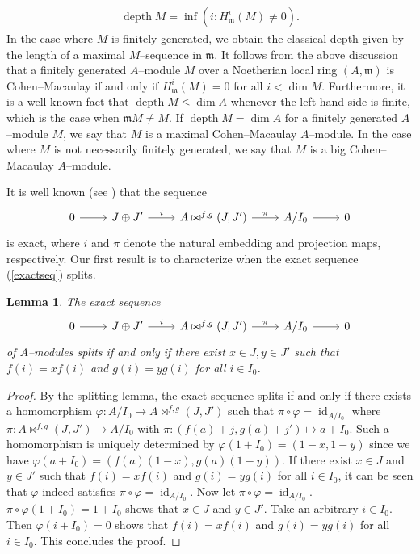 \documentclass{amsart}%
\theoremstyle{plain}
\newtheorem{lemma}{Lemma}[section]
\numberwithin{equation}{section}
\theoremstyle{definition}
\DeclareMathOperator{\depth}{depth}
\begin{document}
\begin{align*}
    \depth M=\inf\left( i:H^{i}_{\mathfrak{m}}(M)\neq0 \right).
\end{align*}
In the case where $M$ is finitely generated, we obtain the classical depth given by the length of a maximal $M$--sequence in $\mathfrak{m}$.  It follows from the above discussion that a finitely generated $A$--module $M$ over a Noetherian local ring $(A,\mathfrak{m})$ is Cohen--Macaulay if and only if $H^i_{\mathfrak{m}}(M)=0$ for all $i<\dim M$. Furthermore, it is a well-known fact that $\depth M\le \dim A$ whenever the left-hand side is finite, which is the case when $\mathfrak{m}M\neq M$. If $\depth M=\dim A$ for a finitely generated $A$--module $M$, we say that $M$ is a maximal Cohen--Macaulay $A$--module. In the case where $M$ is not necessarily finitely generated, we say that $M$ is a big Cohen--Macaulay $A$--module. \medskip

It is well known (see \cite[Proposition 4.1]{KLT}) that the sequence
\begin{equation}\label{exactseq}
    \begin{tikzcd}
	0 & {J\oplus J'} & {A\bowtie^{f,g}(J,J')} & {A/I_0} & 0
	\arrow[from=1-1, to=1-2]
	\arrow["i", from=1-2, to=1-3]
	\arrow["\pi", from=1-3, to=1-4]
	\arrow[from=1-4, to=1-5]
\end{tikzcd}
\end{equation}
is exact, where $i$ and $\pi$ denote the natural embedding and projection maps, respectively. Our first result is to characterize when the exact sequence (\ref{exactseq}) splits.

\begin{lemma}
    The exact sequence 
    \[\begin{tikzcd}
	0 & {J\oplus J'} & {A\bowtie^{f,g}(J,J')} & {A/I_0} & 0
	\arrow[from=1-1, to=1-2]
	\arrow["i", from=1-2, to=1-3]
	\arrow["\pi", from=1-3, to=1-4]
	\arrow[from=1-4, to=1-5]
\end{tikzcd}\]
of $A$--modules splits if and only if there exist $x\in J, y\in J'$ such that $f(i)=xf(i)$ and $g(i)=yg(i)$ for all $i\in I_0$.
\end{lemma}
\begin{proof}
    By the splitting lemma, the exact sequence splits if and only if there exists a homomorphism $\varphi:A/I_0\to A\bowtie^{f,g}(J,J')$ such that $\pi \circ \varphi=\operatorname{id}_{A/I_0}$ where $\pi:A\bowtie^{f,g}(J,J')\to A/I_0$ with $\pi: (f(a)+j,g(a)+j')\mapsto a+I_0$. Such a homomorphism is uniquely determined by $\varphi(1+I_0)=(1-x,1-y)$ since we have $\varphi(a+I_0)=(f(a)(1-x),g(a)(1-y))$. If there exist $x\in J$ and $y\in J'$ such that $f(i)=xf(i)$ and $g(i)=yg(i)$ for all $i\in I_0$, it can be seen that $\varphi$ indeed satisfies $\pi \circ \varphi=\operatorname{id}_{A/I_0}$. Now let $\pi \circ \varphi=\operatorname{id}_{A/I_0}$. $\pi \circ \varphi(1+I_0)=1+I_0$ shows that $x\in J$ and $y\in J'$. Take an arbitrary $i\in I_0$. Then $\varphi(i+I_0)=0$ shows that $f(i)=xf(i)$ and $g(i)=yg(i)$ for all $i\in I_0$. This concludes the proof.
\end{proof}
\end{document}
